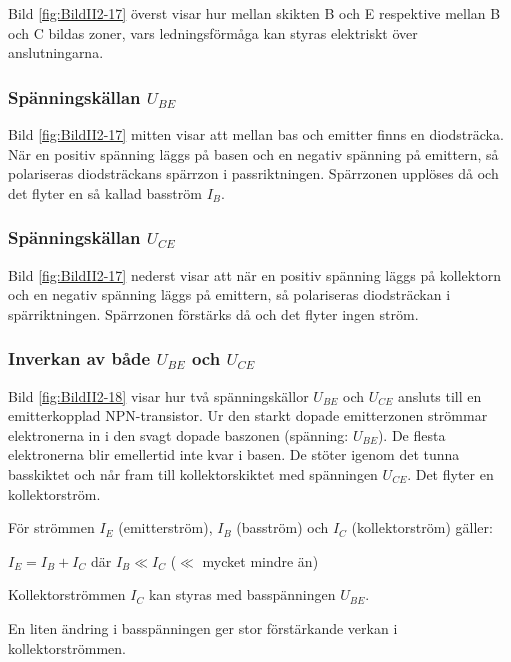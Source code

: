 Bild \ref{fig:BildII2-17} överst visar hur mellan skikten B och E respektive
mellan B och C bildas zoner, vars ledningsförmåga kan styras elektriskt över
anslutningarna.

\subsubsection{Spänningskällan \(U_{BE}\)}

Bild \ref{fig:BildII2-17} mitten visar att mellan bas och emitter finns en
diodsträcka.
När en positiv spänning läggs på basen och en negativ spänning på emittern,
så polariseras diodsträckans spärrzon i passriktningen.
Spärrzonen upplöses då och det flyter en så kallad basström \(I_B\).

\subsubsection{Spänningskällan \(U_{CE}\)}

Bild \ref{fig:BildII2-17} nederst visar att när en positiv spänning läggs
på kollektorn och en negativ spänning läggs på emittern, så polariseras
diodsträckan i spärriktningen.
Spärrzonen förstärks då och det flyter ingen ström.

\subsubsection{Inverkan av både \(U_{BE}\) och \(U_{CE}\)}

Bild \ref{fig:BildII2-18} visar hur två spänningskällor \(U_{BE}\) och
\(U_{CE}\) ansluts till en emitterkopplad NPN-transistor.
Ur den starkt dopade emitterzonen strömmar elektronerna in i den svagt dopade
baszonen (spänning: \(U_{BE}\)).
De flesta elektronerna blir emellertid inte kvar i basen.
De stöter igenom det tunna basskiktet och når fram till
kollektorskiktet med spänningen \(U_{CE}\). Det flyter en kollektorström.

För strömmen \(I_E\) (emitterström), \(I_B\) (basström) och \(I_C\)
(kollektorström) gäller:

\(I_E = I_B + I_C\) där \(I_B \ll I_C\) (\(\ll\) mycket mindre än)

Kollektorströmmen \(I_C\) kan styras med basspänningen \(U_{BE}\).

En liten ändring i basspänningen ger stor förstärkande verkan i
kollektorströmmen.


